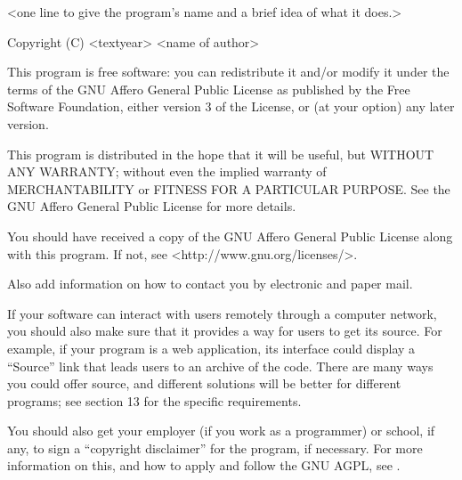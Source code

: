 \startCodeExample
<one line to give the program's name and a brief idea of what it does.>

Copyright (C) <textyear>  <name of author>

This program is free software: you can redistribute it and/or modify it under the terms of the GNU Affero General Public License as published by the Free Software Foundation, either version 3 of the License, or (at your option) any later version.

This program is distributed in the hope that it will be useful, but WITHOUT ANY WARRANTY; without even the implied warranty of MERCHANTABILITY or FITNESS FOR A PARTICULAR PURPOSE.  See the GNU Affero General Public License for more details.

You should have received a copy of the GNU Affero General Public License along with this program.  If not, see <http://www.gnu.org/licenses/>.
\stopCodeExample

Also add information on how to contact you by electronic and paper mail.

If your software can interact with users remotely through a computer network, you should also make sure that it provides a way for users to get its source.  For example, if your program is a web application, its interface could display a ``Source'' link that leads users to an archive of the code.  There are many ways you could offer source, and different solutions will be better for different programs; see section 13 for the specific requirements.

You should also get your employer (if you work as a programmer) or school, if any, to sign a ``copyright disclaimer'' for the program, if necessary.  For more information on this, and how to apply and follow the GNU AGPL, see .

\stopitemize

